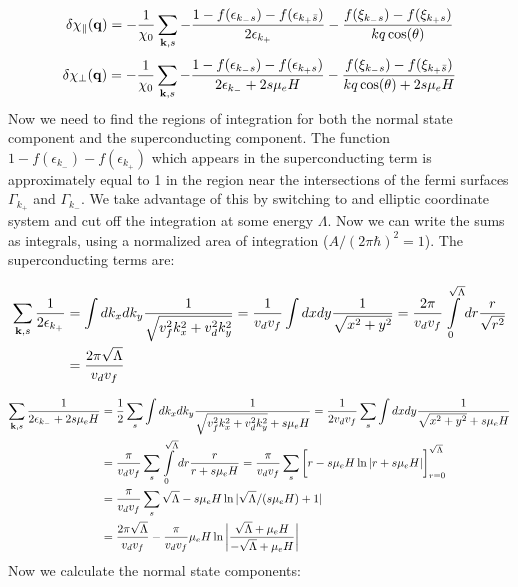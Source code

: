\documentclass{article}
\begin{document}
{\fontsize{8}{7}\selectfont
\begin{align}
\delta\chi_{\parallel}({\bf q})=-\frac{1}{\chi_0}\sum\limits_{{\bf k},s}
-\frac{1-f(\epsilon_{k_-s})-f(\epsilon_{k_+\bar{s}})}{2\epsilon_{k_+}}-\frac{f(\xi_{k_-s})-f(\xi_{k_+s})}{kq\cos(\theta)}
\end{align}
\begin{align}
\delta\chi_{\perp}({\bf q})=-\frac{1}{\chi_0}\sum\limits_{{\bf k},s}
-\frac{1-f(\epsilon_{k_-s})-f(\epsilon_{k_+s})}{2\epsilon_{k_-}+2s\mu_e H}-\frac{f(\xi_{k_-s})-f(\xi_{k_+\bar{s}})}{kq\cos(\theta)+2s\mu_e H}
\end{align}
}
Now we need to find the regions of integration for both the normal state component and the superconducting component. The function $1-f(\epsilon_{k_-})-f(\epsilon_{k_+})$ which appears in the superconducting term is approximately equal to 1 in the region near the intersections of the fermi surfaces $\Gamma_{k_+}$ and $\Gamma_{k_-}$. We take advantage of this by switching to and elliptic coordinate system and cut off the integration at some energy $\Lambda$. Now we can write the sums as integrals, using a normalized area of integration ($A/(2\pi\hbar)^2=1$). The superconducting terms are:

\begin{align}
\sum\limits_{{\bf k},s}\frac{1}{2\epsilon_{k_+}}&=\int dk_xdk_y\frac{1}{\sqrt{v_f^2 k_x^2+v_d^2k_y^2}}=\frac{1}{v_d v_f}\int dx dy\frac{1}{\sqrt{x^2+y^2}}=\frac{2\pi}{v_d v_f}\int\limits_0^{\sqrt{\Lambda}} dr \frac{r}{\sqrt{r^2}} \\
&=\frac{2\pi\sqrt{\Lambda}}{v_d v_f}
\end{align}

\begin{align}
\sum\limits_{{\bf k},s}\frac{1}{2\epsilon_{k_-}+2s\mu_e H} &=\frac{1}{2}\sum\limits_s \int dk_x dk_y \frac{1}{\sqrt{v_f^2 k_x^2+v_d^2 k_y^2}+s\mu_e H} =\frac{1}{2v_d v_f}\sum\limits_s \int dx dy \frac{1}{\sqrt{x^2+y^2}+s\mu_e H}  \\
&=\frac{\pi}{v_d v_f}\sum\limits_s \int\limits_0^{\sqrt{\Lambda}} dr \frac{r}{r+s\mu_e H}  = \frac{\pi}{v_d v_f}\sum\limits_s\bigg[ r -s\mu_e H \ln |r+s\mu_e H| \bigg]_{r=0}^{\sqrt{\Lambda}} \\
&= \frac{\pi}{v_d v_f}\sum\limits_s \sqrt{\Lambda} - s\mu_e H \ln |\sqrt{\Lambda}/(s\mu_e H)+1| \\
&= \frac{2\pi\sqrt{\Lambda}}{v_d v_f} - \frac{\pi}{v_d v_f}\mu_e H \ln\bigg|\frac{\sqrt{\Lambda}+\mu_e H}{-\sqrt{\Lambda}+\mu_e H}\bigg|
\end{align}
Now we calculate the normal state components:
\end{document}

